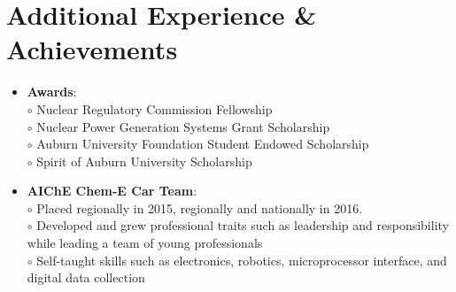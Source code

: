 \documentclass[letterpaper,10pt]{article}
\newcommand{\resumeSubHeadingListStart}{\begin{itemize}[leftmargin=*]}
\newcommand{\resumeSubHeadingListEnd}{\end{itemize}}
\newcommand{\shorterSection}[1]{\vspace{-10pt}\section{#1}}
\newcommand{\spaceCirc}[1]{\hspace{13pt}$\circ$ #1\\}
\begin{document}
\shorterSection{Additional Experience \& Achievements}
  \resumeSubHeadingListStart
  \small
    \item{\textbf{Awards}:\\ 
    \spaceCirc{Nuclear Regulatory Commission Fellowship}
    \spaceCirc{Nuclear Power Generation Systems Grant Scholarship}
    \spaceCirc{Auburn University Foundation Student Endowed Scholarship}
    \spaceCirc{Spirit of Auburn University Scholarship}}
    \item{\textbf{AIChE Chem-E Car Team}:\\
    \spaceCirc{Placed  regionally in 2015,  regionally and \nth{8} nationally in 2016.}
    \spaceCirc{Developed and grew professional traits such as leadership and responsibility while leading a team of young professionals}
    \spaceCirc{Self-taught skills such as electronics, robotics, microprocessor interface, and digital data collection}}
  \resumeSubHeadingListEnd
\end{document}
